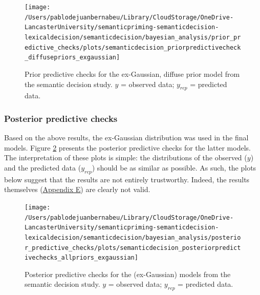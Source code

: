 \documentclass[
  12pt,
  man,floatsintext]{apa7}
\begin{document}
\begin{figure}

{\centering \texttt{[image: /Users/pablodejuanbernabeu/Library/CloudStorage/OneDrive-LancasterUniversity/semanticpriming-semanticdecision-lexicaldecision/semanticdecision/bayesian\_analysis/prior\_predictive\_checks/plots/semanticdecision\_priorpredictivecheck\_diffusepriors\_exgaussian]} 

}

\caption{Prior predictive checks for the ex-Gaussian, diffuse prior model from the semantic decision study. \(y\) = observed data; \(y_{rep}\) = predicted data.}\label{fig:semanticdecision-priorpredictivecheck-diffusepriors-exgaussian}
\end{figure}

\hypertarget{posterior-predictive-checks-1}{%
\subsubsection{Posterior predictive checks}\label{posterior-predictive-checks-1}}

Based on the above results, the ex-Gaussian distribution was used in the final models. Figure \ref{fig:semanticdecision-posteriorpredictivechecks-allpriors-exgaussian} presents the posterior predictive checks for the latter models. The interpretation of these plots is simple: the distributions of the observed (\(y\)) and the predicted data (\(y_{rep}\)) should be as similar as possible. As such, the plots below suggest that the results are not entirely trustworthy. Indeed, the results themselves (\protect\hyperlink{appendix-E-Bayesian-analysis-results}{\underline{Appendix E}}) are clearly not valid.



\begin{figure}

{\centering \texttt{[image: /Users/pablodejuanbernabeu/Library/CloudStorage/OneDrive-LancasterUniversity/semanticpriming-semanticdecision-lexicaldecision/semanticdecision/bayesian\_analysis/posterior\_predictive\_checks/plots/semanticdecision\_posteriorpredictivechecks\_allpriors\_exgaussian]} 

}

\caption{Posterior predictive checks for the (ex-Gaussian) models from the semantic decision study. \(y\) = observed data; \(y_{rep}\) = predicted data.}\label{fig:semanticdecision-posteriorpredictivechecks-allpriors-exgaussian}
\end{figure}
\end{document}
